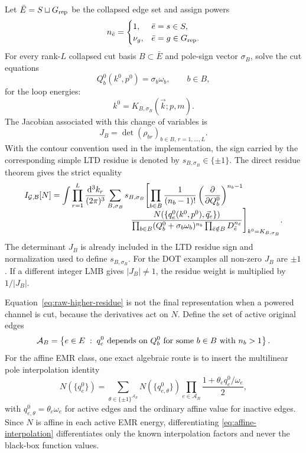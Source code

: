 \documentclass[11pt,a4paper]{report}
\newcommand{\dd}{\mathrm{d}}
\newcommand{\Graph}{\mathcal G}
\newcommand{\Basis}{\mathcal B}
\newcommand{\Active}{\mathcal A}
\begin{document}
Let \(\bar E=S\sqcup G_{\rm rep}\) be the collapsed edge set and assign powers
\[
  n_{\bar e}=
  \begin{cases}
    1, & \bar e=s\in S,\\
    \nu_g, & \bar e=g\in G_{\rm rep}.
  \end{cases}
\]
For every rank-\(L\) collapsed cut basis \(B\subset\bar E\) and pole-sign vector
\(\sigma_B\), solve the cut equations
\begin{equation}
  Q_b^0(k^0,p^0)=\sigma_b\omega_b,\qquad b\in B,
  \label{eq:cut-equations}
\end{equation}
for the loop energies:
\begin{equation}
  k^0=K_{B,\sigma_B}(\vec k;p,m).
\end{equation}
The Jacobian associated with this change of variables is
\begin{equation}
  J_{B}=\det(\rho_{br})_{b\in B,\,r=1,\ldots,L}.
\end{equation}
With the contour convention used in the implementation, the sign carried by
the corresponding simple LTD residue is denoted by
\(s_{B,\sigma_B}\in\{\pm1\}\).  The direct residue theorem gives the strict
equality
\begin{align}
  I_{\Graph,\Basis}[N]
  &=
  \int \prod_{r=1}^{L}\frac{\dd^3 k_r}{(2\pi)^3}
  \sum_{B,\sigma_B}
  s_{B,\sigma_B}
  \Biggl[
  \prod_{b\in B}
  \frac{1}{(n_b-1)!}
  \left(\frac{\partial}{\partial Q_b^0}\right)^{n_b-1}
  \notag\\[-2mm]
  &\hspace{34mm}
  \frac{
    N(\{q_e^0(k^0,p^0),\vec q_e\})
  }{
    \prod_{b\in B}(Q_b^0+\sigma_b\omega_b)^{n_b}
    \prod_{\bar e\notin B}D_{\bar e}^{n_{\bar e}}
  }
  \Biggr]_{k^0=K_{B,\sigma_B}} .
  \label{eq:raw-higher-residue}
\end{align}
The determinant \(J_B\) is already included in the LTD residue sign and
normalization used to define \(s_{B,\sigma_B}\).  For the DOT examples all
non-zero \(J_B\) are \(\pm1\).  If a different integer LMB gives
\(|J_B|\ne1\), the residue weight is multiplied by \(1/|J_B|\).

Equation~\eqref{eq:raw-higher-residue} is not the final representation when a powered
channel is cut, because the derivatives act on \(N\).  Define the set of active
original edges
\begin{equation}
  \Active_B
  =
  \left\{
  e\in E\;:\;
  q_e^0 \hbox{ depends on } Q_b^0
  \hbox{ for some } b\in B \hbox{ with } n_b>1
  \right\}.
  \label{eq:active-edges}
\end{equation}
For the affine EMR class, one exact algebraic route is to insert the
multilinear pole interpolation identity
\begin{equation}
  N(\{q_e^0\})
  =
  \sum_{\theta\in\{\pm1\}^{\Active_B}}
  N\!\left(\{q_{e,\theta}^0\}\right)
  \prod_{e\in\Active_B}
  \frac{1+\theta_e q_e^0/\omega_e}{2},
  \label{eq:affine-interpolation}
\end{equation}
with \(q_{e,\theta}^0=\theta_e\omega_e\) for active edges and the ordinary
affine value for inactive edges.  Since \(N\) is affine in each active EMR
energy, differentiating \eqref{eq:affine-interpolation} differentiates only the
known interpolation factors and never the black-box function values.
\end{document}
